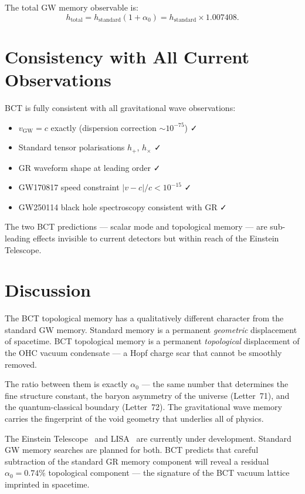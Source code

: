 \documentclass[aps,prl,twocolumn,superscriptaddress,showpacs]{revtex4-2}
\begin{document}
The total GW memory observable is:
\begin{equation}
h_\mathrm{total} = h_\mathrm{standard}(1 + \alpha_0) 
= h_\mathrm{standard}\times 1.007408.
\end{equation}

\section{Consistency with All Current Observations}

BCT is fully consistent with all gravitational wave observations:

\begin{itemize}
\item $v_\mathrm{GW} = c$ exactly (dispersion correction 
$\sim10^{-75}$) ✓
\item Standard tensor polarisations $h_+$, $h_\times$ ✓  
\item GR waveform shape at leading order ✓
\item GW170817 speed constraint $|v-c|/c < 10^{-15}$ ✓
\item GW250114 black hole spectroscopy consistent with GR ✓
\end{itemize}

The two BCT predictions — scalar mode and topological memory 
— are sub-leading effects invisible to current detectors but 
within reach of the Einstein Telescope.

\section{Discussion}

The BCT topological memory has a qualitatively different 
character from the standard GW memory. Standard memory is 
a permanent \emph{geometric} displacement of spacetime. 
BCT topological memory is a permanent \emph{topological} 
displacement of the OHC vacuum condensate — a Hopf charge 
scar that cannot be smoothly removed.

The ratio between them is exactly $\alpha_0$ — the same 
number that determines the fine structure constant, the 
baryon asymmetry of the universe (Letter~71), and the 
quantum-classical boundary (Letter~72). The gravitational 
wave memory carries the fingerprint of the void geometry 
that underlies all of physics.

The Einstein Telescope~\cite{ET} and LISA~\cite{LISA} are 
currently under development. Standard GW memory searches are 
planned for both. BCT predicts that careful subtraction of 
the standard GR memory component will reveal a residual 
$\alpha_0 = 0.74\%$ topological component — the signature 
of the BCT vacuum lattice imprinted in spacetime.
\end{document}
